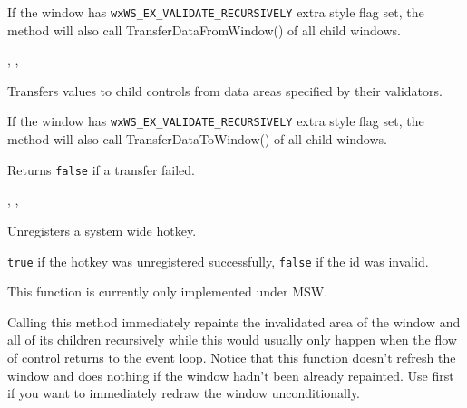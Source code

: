 If the window has {\tt wxWS\_EX\_VALIDATE\_RECURSIVELY} extra style flag set,
the method will also call TransferDataFromWindow() of all child windows.


,\rtfsp
{}, 


\label{wxwindowtransferdatatowindow}


Transfers values to child controls from data areas specified by their validators.

If the window has {\tt wxWS\_EX\_VALIDATE\_RECURSIVELY} extra style flag set,
the method will also call TransferDataToWindow() of all child windows.


Returns {\tt false} if a transfer failed.


,\rtfsp
{}, 


\label{wxwindowunregisterhotkey}


Unregisters a system wide hotkey.




{\tt true} if the hotkey was unregistered successfully, {\tt false} if the id was invalid.


This function is currently only implemented under MSW.




\label{wxwindowupdate}


Calling this method immediately repaints the invalidated area of the window and
all of its children recursively while this would usually only happen when the
flow of control returns to the event loop. Notice that this function doesn't
refresh the window and does nothing if the window hadn't been already
repainted. Use  first if you want to
immediately redraw the window unconditionally.


